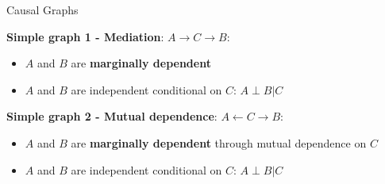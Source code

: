 \documentclass[compress, 8pt]{beamer}
\begin{document}
\begin{frame}{Causal Graphs}

\textbf{Simple graph 1 - Mediation}: $A \rightarrow C \rightarrow B$:
\begin{figure}
\end{figure}
\begin{itemize}
    \item $A$ and $B$ are \textbf{marginally dependent}
    \item $A$ and $B$ are independent conditional on $C$: $A \perp B \vert C$
\end{itemize}

\textbf{Simple graph 2 - Mutual dependence}: $A \leftarrow C \rightarrow B$:
\begin{figure}
\end{figure}
\begin{itemize}
    \item $A$ and $B$ are \textbf{marginally dependent} through mutual dependence on $C$
    \item $A$ and $B$ are independent conditional on $C$: $A \perp B \vert C$
\end{itemize}

\end{frame}


\end{document}
